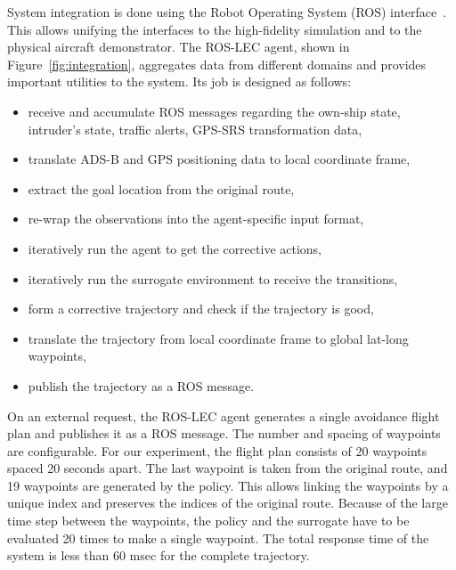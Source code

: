 System integration is done using the Robot Operating System (ROS) interface~\cite{quigley2009ros}. This allows unifying the interfaces to the high-fidelity simulation and to the physical aircraft demonstrator.
The ROS-LEC agent, shown in Figure~\ref{fig:integration}, aggregates data from different domains and provides important utilities to the system. Its job is designed as follows: 
\begin{itemize}
	\item receive and accumulate ROS messages regarding the own-ship state,
	intruder's state, traffic alerts, GPS-SRS transformation data,
	\item translate ADS-B and GPS positioning data to local coordinate frame,
	\item extract the goal location from the original route,
	\item re-wrap the observations into the agent-specific input format,
	\item iteratively run the agent to get the corrective actions,
	\item iteratively run the surrogate environment to receive the transitions,
	\item form a corrective trajectory and check if the trajectory is good,
	\item translate the trajectory from local coordinate frame to global lat-long waypoints,
	\item publish the trajectory as a ROS message.
\end{itemize}

On an external request, the ROS-LEC agent generates a single avoidance flight plan and publishes it as a ROS message. The number and spacing of waypoints are configurable.  For our experiment, the flight plan consists of 20 waypoints spaced 20 seconds apart. The last waypoint is taken from the original route, and 19 waypoints are generated by the policy. This allows linking the waypoints by a unique index and preserves the indices of the original route.
Because of the large time step between the waypoints, the policy and the surrogate have to be evaluated 20 times to make a single waypoint. The total response time of the system is less than 60 msec for the complete trajectory.

